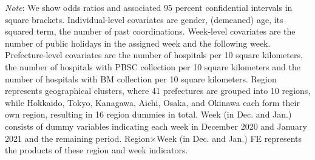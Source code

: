 \documentclass[12pt, a4paper]{article}
\begin{document}
\begin{landscape}
\begin{table}[H]
\begin{threeparttable}
\begin{tabular}[t]{lcccccc}
\bottomrule
\end{tabular}
\begin{tablenotes}
\item \emph{Note}: We show odds ratios and associated 95 percent confidential intervals in square brackets. Individual-level covariates are gender, (demeaned) age, its squared term, the number of past coordinations. Week-level covariates are the number of public holidays in the assigned week and the following week. Prefecture-level covariates are the number of hospitals per 10 square kilometers, the number of hospitals with PBSC collection per 10 square kilometers and the number of hospitals with BM collection per 10 square kilometers. Region represents geographical clusters, where 41 prefectures are grouped into 10 regions, while Hokkaido, Tokyo, Kanagawa, Aichi, Osaka, and Okinawa each form their own region, resulting in 16 region dummies in total. Week (in Dec. and Jan.) consists of dummy variables indicating each week in December 2020 and January 2021 and the remaining period. Region$\times$Week (in Dec. and Jan.) FE represents the products of these region and week indicators.
\end{tablenotes}
\end{threeparttable}
\end{table}
\end{landscape}
\end{document}
